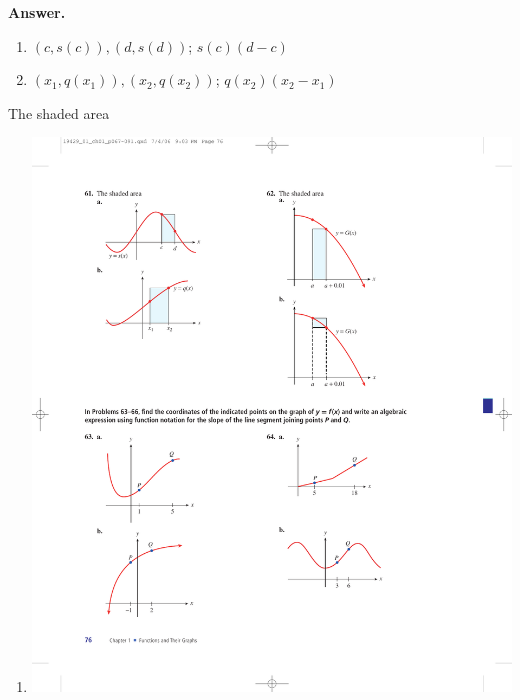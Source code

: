 \documentclass[10pt,]{book}
\theoremstyle{plain}
\theoremstyle{definition}
\theoremstyle{definition}
\theoremstyle{definition}
\theoremstyle{definition}
\numberwithin{equation}{part}
\begin{document}
\begin{exercisegroup}
\begin{multicols}{2}
\begin{enumerate}[label=*\alph**]
%
\end{enumerate}
\end{multicols}
%
\par\smallskip
\noindent\textbf{Answer.}\hypertarget{answer-156}{}\quad
\leavevmode%
\begin{multicols}{2}
\begin{enumerate}[label=*\alph**]
\item\hypertarget{li-1086}{}\((c,s(c)),(d,s(d))\); \(s(c)(d - c)\)%
\item\hypertarget{li-1087}{}\((x_1,q(x_1)),(x_2,q(x_2))\); \(q(x_2)(x_2 - x_1)\)%
\end{enumerate}
\end{multicols}
%
\exercise[62.]\hypertarget{exercise-277}{}The shaded area \leavevmode%
\begin{multicols}{2}
\begin{enumerate}[label=*\alph**]
\item\hypertarget{li-1088}{}\includegraphics[width=0.8\linewidth]{images/fig-ex-1-4-62a}
%

\end{enumerate}
\end{multicols}
\end{exercisegroup}
\end{document}
